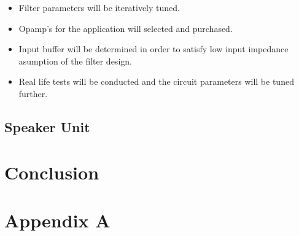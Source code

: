 \documentclass[letterpaper,12pt]{article}
\begin{document}
\begin{itemize}
    \item Filter parameters will be iteratively tuned.
    \item Opamp's for the application will selected and purchased.
    \item Input buffer will be determined in order to satisfy low input impedance asumption of the filter design.
    \item Real life tests will be conducted and the circuit parameters will be tuned further.
\end{itemize}
\subsection{Speaker Unit}

\section{Conclusion}
\section*{Appendix A}
\end{document}
